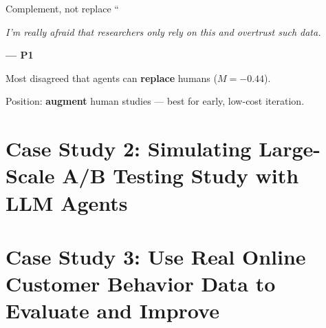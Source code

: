 \documentclass[scheme=plain,aspectratio=169]{beamer}
\renewcommand{\cite}{\footcite}
\begin{document}
\begin{frame}[c]{Complement, not replace}
  \centering
  {\color{barneg}\fontsize{42}{42}\selectfont ``}\par
  \vspace{-0.2em}
  \begin{minipage}{0.82\linewidth}\centering
    {\LARGE\itshape I'm really afraid that researchers only rely on this and overtrust such data.}
  \end{minipage}\par
  \vspace{0.5em}
  {\bfseries --- P1}\par
  \vspace{1.6em}
  {\small Most disagreed that agents can \textbf{replace} humans ($M=-0.44$).
  
  Position: \textbf{augment} human studies --- best for early, low-cost iteration.}
\end{frame}

\section[Case Study 2: Simulating Large-Scale A/B Testing Study with LLM Agents]{Case Study 2: Simulating Large-Scale A/B Testing Study with LLM Agents}





\section[Case Study 3: Can LLM Agents Simulate Multi-Turn Human Behavior?]{Case Study 3: Use Real Online Customer Behavior Data to Evaluate and Improve}


\end{document}
